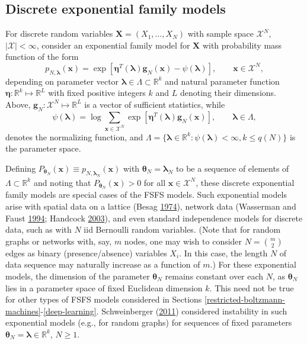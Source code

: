 \documentclass[12pt]{article}
\theoremstyle{definition}
\begin{document}
\subsection{Discrete exponential family
models}\label{discrete-exponential-family-models}

For discrete random variables \(\boldsymbol X = (X_1, \dots, X_N)\) with
sample space \(\mathcal{X}^N\), \(|\mathcal{X}| < \infty\), consider an
exponential family model for \(\boldsymbol X\) with probability mass
function of the form \[
p_{N, \boldsymbol \lambda}(\boldsymbol x) = \exp\left[\boldsymbol\eta^T(\boldsymbol \lambda) \boldsymbol g_N(\boldsymbol x) - \psi(\boldsymbol \lambda)\right], \qquad \boldsymbol x \in \mathcal{X}^N,
\] depending on parameter vector
\(\boldsymbol \lambda \in \Lambda \subset \mathbb{R}^{k}\) and natural
parameter function
\(\boldsymbol \eta : \mathbb{R}^k \mapsto \mathbb{R}^L\) with fixed
positive integers \(k\) and \(L\) denoting their dimensions. Above,
\(\boldsymbol g_N : \mathcal{X}^N \mapsto \mathbb{R}^L\) is a vector of
sufficient statistics, while \[
\psi(\boldsymbol \lambda) = \log \sum\limits_{\boldsymbol x \in \mathcal{X}^N}\exp\left[\boldsymbol \eta^T(\boldsymbol \lambda) \boldsymbol g_N(\boldsymbol x) \right], \qquad \boldsymbol \lambda \in \Lambda,
\] denotes the normalizing function, and
\(\Lambda = \{\boldsymbol \lambda \in \mathbb{R}^k : \psi(\boldsymbol \lambda) < \infty, k \le q(N) \}\)
is the parameter space.

Defining
\(P_{\boldsymbol \theta_N}(\boldsymbol x)\equiv p_{N,\boldsymbol \lambda_N}(\boldsymbol x)\)
with \(\boldsymbol \theta_N=\boldsymbol \lambda_N\) to be a sequence of
elements of \(\Lambda \subset \mathbb{R}^k\) and noting that
\(P_{\boldsymbol \theta_N}(\boldsymbol x) > 0\) for all
\(\boldsymbol x \in \mathcal{X}^N\), these discrete exponential family
models are special cases of the FSFS models. Such exponential models
arise with spatial data on a lattice (Besag
\protect\hyperlink{ref-besag1974spatial}{1974}), network data (Wasserman
and Faust \protect\hyperlink{ref-wasserman1994social}{1994}; Handcock
\protect\hyperlink{ref-handcock2003assessing}{2003}), and even standard
independence models for discrete data, such as with \(N\) iid Bernoulli
random variables. (Note that for random graphs or networks with, say,
\(m\) nodes, one may wish to consider \(N={m \choose 2}\) edges as
binary (presence/absence) variables \(X_i\). In this case, the length
\(N\) of data sequence may naturally increase as a function of \(m\).)
For these exponential models, the dimension of the parameter
\(\boldsymbol \theta_N\) remains constant over each \(N\), as
\(\boldsymbol \theta_N\) lies in a parameter space of fixed Euclidean
dimension \(k\). This need not be true for other types of FSFS models
considered in Sections
\ref{restricted-boltzmann-machines}-\ref{deep-learning}. Schweinberger
(\protect\hyperlink{ref-schweinberger2011instability}{2011}) considered
instability in such exponential models (e.g., for random graphs) for
sequences of fixed parameters
\(\boldsymbol \theta_N=\boldsymbol \lambda\in\mathbb{R}^k\),
\(N \geq 1\).
\end{document}
